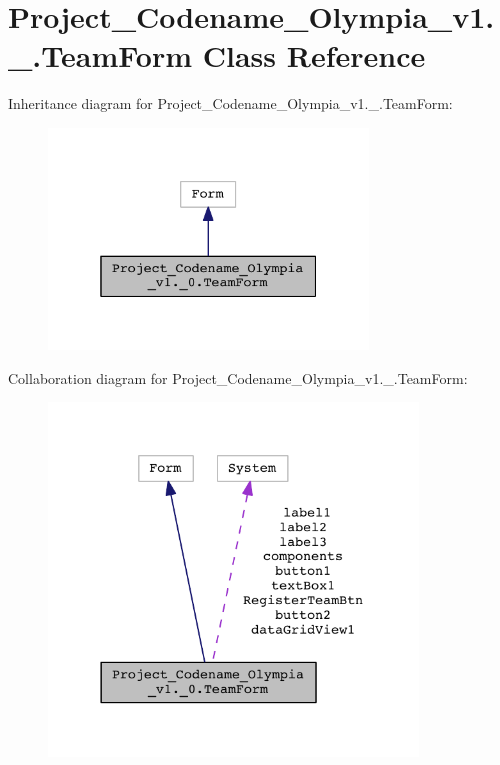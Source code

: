 \hypertarget{classProject__Codename__Olympia__v1_1_1__0_1_1TeamForm}{}\section{Project\+\_\+\+Codename\+\_\+\+Olympia\+\_\+v1.\+\_.\+Team\+Form Class Reference}
\label{classProject__Codename__Olympia__v1_1_1__0_1_1TeamForm}


Inheritance diagram for Project\+\_\+\+Codename\+\_\+\+Olympia\+\_\+v1.\+\_.\+Team\+Form\+:\nopagebreak
\begin{figure}[H]
\begin{center}
\leavevmode
\includegraphics[width=241pt]{classProject__Codename__Olympia__v1_1_1__0_1_1TeamForm__inherit__graph}
\end{center}
\end{figure}


Collaboration diagram for Project\+\_\+\+Codename\+\_\+\+Olympia\+\_\+v1.\+\_.\+Team\+Form\+:\nopagebreak
\begin{figure}[H]
\begin{center}
\leavevmode
\includegraphics[width=278pt]{classProject__Codename__Olympia__v1_1_1__0_1_1TeamForm__coll__graph}
\end{center}
\end{figure}
